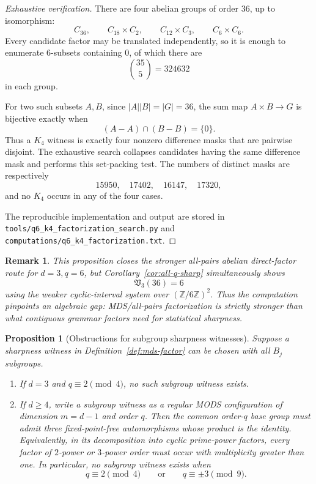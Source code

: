 \documentclass[11pt]{article}
\newtheorem{proposition}[theorem]{Proposition}
\newtheorem{remark}[theorem]{Remark}
\begin{document}
\begin{proof}[Exhaustive verification]
There are four abelian groups of order \(36\), up to isomorphism:
\[
 C_{36},\qquad C_{18}\times C_2,\qquad C_{12}\times C_3,\qquad C_6\times C_6.
\]
Every candidate factor may be translated independently, so it is enough to
enumerate \(6\)-subsets containing \(0\), of which there are
\[
 \binom{35}{5}=324632
\]
in each group.

For two such subsets \(A,B\), since \(|A||B|=|G|=36\), the sum map
\(A\times B\to G\) is bijective exactly when
\[
 (A-A)\cap(B-B)=\{0\}.
\]
Thus a \(K_4\) witness is exactly four nonzero difference masks that are
pairwise disjoint. The exhaustive search collapses candidates having the
same difference mask and performs this set-packing test. The numbers of
distinct masks are respectively
\[
 15950,\quad 17402,\quad 16147,\quad 17320,
\]
and no \(K_4\) occurs in any of the four cases.

The reproducible implementation and output are stored in
\texttt{tools/q6\_k4\_factorization\_search.py} and
\texttt{computations/q6\_k4\_factorization.txt}.
\end{proof}

\begin{remark}
This proposition closes the stronger all-pairs abelian direct-factor route
for \(d=3,q=6\), but Corollary~\ref{cor:all-q-sharp} simultaneously shows
\[
 \mathfrak V_3(36)=6
\]
using the weaker cyclic-interval system over
\((\mathbb Z/6\mathbb Z)^2\). Thus the computation pinpoints an algebraic
gap: MDS/all-pairs factorization is strictly stronger than what contiguous
grammar factors need for statistical sharpness.
\end{remark}
\begin{proposition}[Obstructions for subgroup sharpness witnesses]
\label{prop:subgroup-sharpness-obstruction}
Suppose a sharpness witness in Definition~\ref{def:mds-factor} can be chosen
with all \(B_j\) subgroups.

\begin{enumerate}
\item If \(d=3\) and \(q\equiv2\pmod4\), no such subgroup witness exists.
\item If \(d\ge4\), write a subgroup witness as a regular MODS configuration
of dimension \(m=d-1\) and order \(q\).  Then the common order-\(q\) base
group must admit three fixed-point-free automorphisms whose product is the
identity.  Equivalently, in its decomposition into cyclic prime-power
factors, every factor of \(2\)-power or \(3\)-power order must occur with
multiplicity greater than one.  In particular, no subgroup witness exists
when
\[
 q\equiv2\pmod4
 \qquad\text{or}\qquad
 q\equiv\pm3\pmod9.
\]
\end{enumerate}
\end{proposition}
\end{document}
